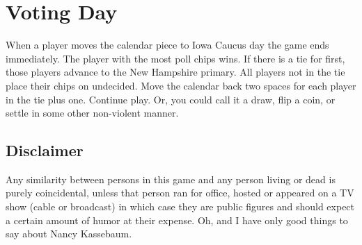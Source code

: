 \documentclass[twocolumn]{article}
\begin{document}
\section{Voting Day}

When a player moves the calendar piece to Iowa Caucus day the game ends immediately. The player with the most poll chips wins. If there is a tie for first,
those players advance to the New Hampshire primary. All players not in the tie place their chips on undecided.
Move the calendar back two spaces for each player in the tie plus one. Continue play. Or, you could call it a draw, flip a coin, or settle in
some other non-violent manner.

\subsection{Disclaimer}

Any similarity between persons in this game and any person living or dead is purely coincidental, unless that person ran for office, hosted or appeared on a TV show
(cable or broadcast) in which case they are public figures and should expect a certain amount of humor at their expense. Oh, and I have only good things to say about Nancy Kassebaum.
\end{document}
